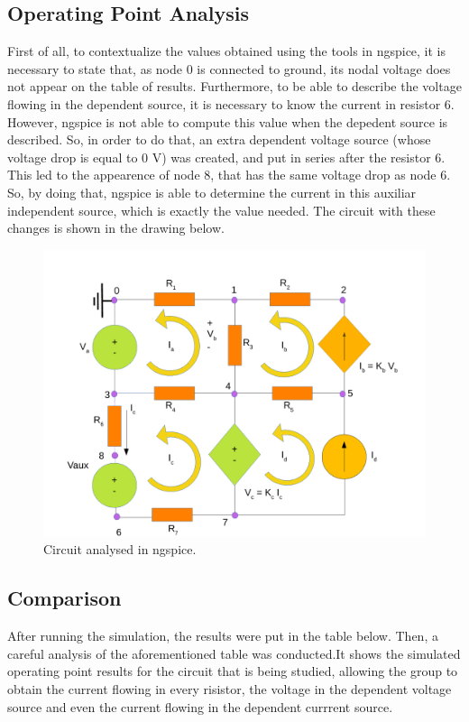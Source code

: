 \subsection{Operating Point Analysis}
First of all, to contextualize the values obtained using the tools in ngspice, it is necessary to state that, as node 0 is connected to ground, its nodal voltage does not appear on the table of results. Furthermore, to be able to describe the voltage flowing in the dependent source, it is necessary to know the current in resistor 6. However, ngspice is not able to compute this value when the depedent source is described. So, in order to do that, an extra dependent voltage source (whose voltage drop is equal to 0 V) was created, and put in series after the resistor 6. This led to the appearence of node 8, that has the same voltage drop as node 6. So, by doing that, ngspice is able to determine the current in this auxiliar independent source, which is exactly the value needed.
 The circuit with these changes is shown in the drawing below.

\begin{figure}[ht] \centering
\includegraphics[width=1.0\linewidth]{simdraw.pdf}
\caption{Circuit analysed in ngspice.}
\label{simdraw}
\end{figure}

\subsection{Comparison}
After running the simulation, the results were put in the table below. Then, a careful analysis of the aforementioned table was conducted.It shows the simulated operating point results for the circuit that is being studied, allowing the group to obtain the current flowing in every risistor, the voltage in the dependent voltage source and even the current flowing in the dependent currrent source. 

